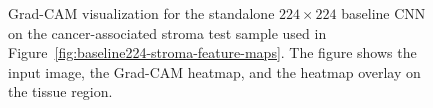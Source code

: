 \begin{figure}[htbp]
    \centering
    
    \caption{Grad-CAM visualization for the standalone $224 \times 224$
    baseline CNN on the cancer-associated stroma test sample used in
    Figure~\ref{fig:baseline224-stroma-feature-maps}. The figure shows the
    input image, the Grad-CAM heatmap, and the heatmap overlay on the tissue
    region.}
    \label{fig:baseline224-stroma-gradcam}
\end{figure}
